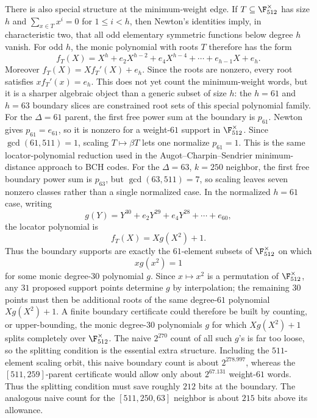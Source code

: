 There is also special structure at the minimum-weight edge.  If \(T\subseteq\F_{512}^\times\) has size \(h\) and
\(\sum_{x\in T}x^i=0\) for \(1\le i<h\), then Newton's identities imply, in characteristic two, that all odd elementary
symmetric functions below degree \(h\) vanish.  For odd \(h\), the monic polynomial with roots \(T\) therefore has the
form
\[
f_T(X)=X^h+e_2X^{h-2}+e_4X^{h-4}+\cdots+e_{h-1}X+e_h.
\]
Moreover \(f_T(X)=X f_T'(X)+e_h\).  Since the roots are nonzero, every root satisfies \(x f_T'(x)=e_h\).  This does
not yet count the minimum-weight words, but it is a sharper algebraic object than a generic subset of size \(h\): the
\(h=61\) and \(h=63\) boundary slices are constrained root sets of this special polynomial family.
For the \(\Delta=61\) parent, the first free power sum at the boundary is \(p_{61}\).  Newton gives
\(p_{61}=e_{61}\), so it is nonzero for a weight-\(61\) support in \(\F_{512}^\times\).  Since \(\gcd(61,511)=1\),
scaling \(T\mapsto \beta T\) lets one normalize \(p_{61}=1\).  This is the same locator-polynomial reduction used in
the Augot--Charpin--Sendrier minimum-distance approach to BCH codes.  For the \(\Delta=63\), \(k=250\) neighbor, the
first free boundary power sum is \(p_{63}\), but \(\gcd(63,511)=7\), so scaling leaves seven nonzero classes rather
than a single normalized case.
In the normalized \(h=61\) case, writing
\[
g(Y)=Y^{30}+e_2Y^{29}+e_4Y^{28}+\cdots+e_{60},
\]
the locator polynomial is
\[
f_T(X)=Xg(X^2)+1.
\]
Thus the boundary supports are exactly the \(61\)-element subsets of \(\F_{512}^\times\) on which
\[
xg(x^2)=1
\]
for some monic degree-\(30\) polynomial \(g\).  Since \(x\mapsto x^2\) is a permutation of \(\F_{512}^\times\), any
\(31\) proposed support points determine \(g\) by interpolation; the remaining \(30\) points must then be additional
roots of the same degree-\(61\) polynomial \(Xg(X^2)+1\).  A finite boundary certificate could therefore be built by
counting, or upper-bounding, the monic degree-\(30\) polynomials \(g\) for which \(Xg(X^2)+1\) splits completely over
\(\F_{512}^\times\).  The naive \(2^{270}\) count of all such \(g\)'s is far too loose, so the splitting condition is
the essential extra structure.  Including the \(511\)-element scaling orbit, this naive boundary count is about
\(2^{278.997}\), whereas the \([511,259]\)-parent certificate would allow only about \(2^{67.131}\) weight-\(61\)
words.  Thus the splitting condition must save roughly \(212\) bits at the boundary.  The analogous naive count for
the \([511,250,63]\) neighbor is about \(215\) bits above its allowance.
